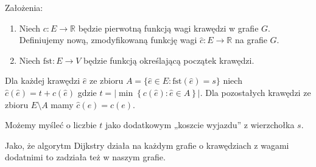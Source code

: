 \documentclass[14pt]{article}
\begin{document}
Założenia:
\begin{enumerate}
  \item Niech $c: E\to \mathbb{R}$ będzie pierwotną funkcją wagi krawędzi w grafie $G$. Definiujemy nową, zmodyfikowaną funkcję wagi $\hat{c}: E\to \mathbb{R}$ na grafie $G$.
  \item Niech $\mathrm{fst}: E\to V$ będzie funkcją określającą początek krawędzi.
\end{enumerate}

Dla każdej krawędzi $\hat{e}$ ze zbioru $A = \{ \hat{e}\in E: \mathrm{fst}(\hat{e}) = s \}$ niech $\hat{c}(\hat{e}) = t + c(\hat{e})$ gdzie $t=\left|\min\left\{ c(\hat{e}): \hat{e} \in A \right\}\right|$. Dla pozostałych krawędzi ze zbioru $E\setminus A$ mamy $\hat{c}(e) = c(e)$.

Możemy myśleć o liczbie $t$ jako dodatkowym „koszcie wyjazdu” z wierzchołka $s$.

Jako, że algorytm Dijkstry działa na każdym grafie o krawędziach z wagami dodatnimi to zadziała też w naszym grafie.
\end{document}
